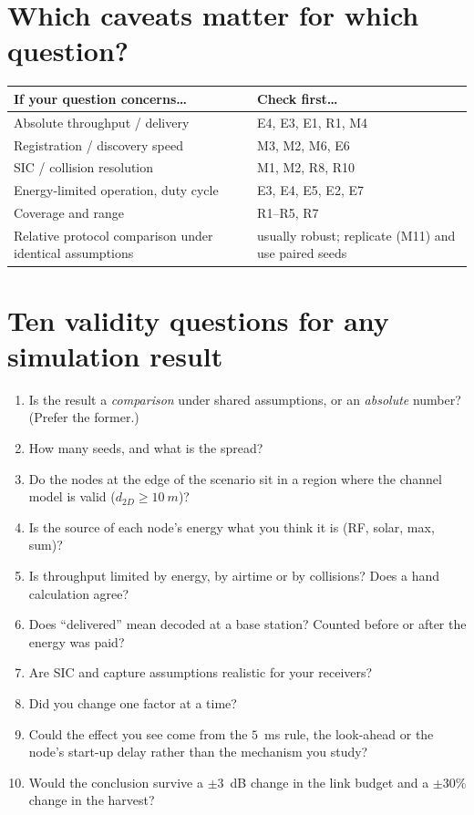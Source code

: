 \section{Which caveats matter for which question?}

\begin{center}
\small
\renewcommand{\arraystretch}{1.15}
\begin{tabularx}{\linewidth}{@{}>{\raggedright}p{4.8cm}X@{}}
\toprule
If your question concerns\ldots & Check first\ldots\\
\midrule
Absolute throughput / delivery & E4, E3, E1, R1, M4\\
Registration / discovery speed & M3, M2, M6, E6\\
SIC / collision resolution & M1, M2, R8, R10\\
Energy-limited operation, duty cycle & E3, E4, E5, E2, E7\\
Coverage and range & R1--R5, R7\\
Relative protocol comparison under identical assumptions & usually robust; replicate (M11) and use paired seeds\\
\bottomrule
\end{tabularx}
\end{center}

\section{Ten validity questions for any simulation result}
\label{sec:validityq}

\begin{enumerate}
 \item Is the result a \emph{comparison} under shared assumptions, or an \emph{absolute} number? (Prefer the former.)
 \item How many seeds, and what is the spread?
 \item Do the nodes at the edge of the scenario sit in a region where the channel model is valid ($d_{2D}\ge\SI{10}{m}$)?
 \item Is the source of each node's energy what you think it is (RF, solar, max, sum)?
 \item Is throughput limited by energy, by airtime or by collisions? Does a hand calculation agree?
 \item Does ``delivered'' mean decoded at a base station? Counted before or after the energy was paid?
 \item Are SIC and capture assumptions realistic for your receivers?
 \item Did you change one factor at a time?
 \item Could the effect you see come from the $5$~ms rule, the look-ahead or the node's start-up delay rather than the mechanism you study?
 \item Would the conclusion survive a $\pm3$~dB change in the link budget and a $\pm30\%$ change in the harvest?
\end{enumerate}


